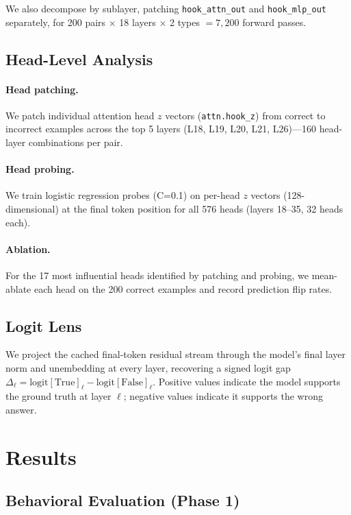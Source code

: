 \documentclass{article}
\begin{document}
We also decompose by sublayer, patching \texttt{hook\_attn\_out} and \texttt{hook\_mlp\_out} separately, for 200 pairs $\times$ 18 layers $\times$ 2 types $= 7{,}200$ forward passes.

\subsection{Head-Level Analysis}

\paragraph{Head patching.} We patch individual attention head $z$ vectors (\texttt{attn.hook\_z}) from correct to incorrect examples across the top 5 layers (L18, L19, L20, L21, L26)—160 head-layer combinations per pair.

\paragraph{Head probing.} We train logistic regression probes (C=0.1) on per-head $z$ vectors (128-dimensional) at the final token position for all 576 heads (layers 18--35, 32 heads each).

\paragraph{Ablation.} For the 17 most influential heads identified by patching and probing, we mean-ablate each head on the 200 correct examples and record prediction flip rates.

\subsection{Logit Lens}

We project the cached final-token residual stream through the model's final layer norm and unembedding at every layer, recovering a signed logit gap $\Delta_\ell = \text{logit}[\text{True}]_\ell - \text{logit}[\text{False}]_\ell$. Positive values indicate the model supports the ground truth at layer $\ell$; negative values indicate it supports the wrong answer.

\section{Results}
\label{sec:results}

\subsection{Behavioral Evaluation (Phase 1)}
\end{document}
